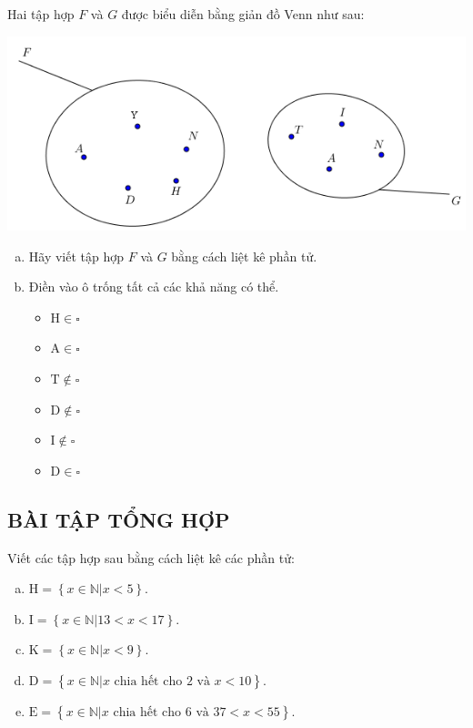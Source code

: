 \begin{bt}
Hai tập hợp $F$ và $G$ được biểu diễn bằng giản đồ Venn như sau:
\begin{center}
\includegraphics[scale=0.75]{img/bai4}
\end{center}
\begin{enumerate}[a)]
\item Hãy viết tập hợp $F$ và $G$ bằng cách liệt kê phần tử.
\item Điền vào ô trống tất cả các khả năng có thể. 
\begin{multicols}{2}
\begin{itemize}
\item $\text{H} \in \square$
\item $\text{A} \in \square$
\item $\text{T} \notin \square$
\item $\text{D} \notin \square$
\item $\text{I} \notin \square$
\item $\text{D} \in \square$
\end{itemize}
\end{multicols}
\end{enumerate}
\subsection{BÀI TẬP TỔNG HỢP}
\end{bt} 
\begin{bt}
Viết các tập hợp sau bằng cách liệt kê các phần tử:
\begin{enumerate}[a)]
\item $\mathrm{H}=\left\{ x\in \mathbb{N}| x < 5 \right\}$.
\item $\mathrm{I}=\left\{ x\in \mathbb{N}| 13 < x < 17 \right\}$.
\item $\mathrm{K}=\left\{ x\in \mathbb{N}| x < 9 \right\}$.
\item $\mathrm{D}=\left\{x\in \mathbb{N}| x \text{ chia hết cho }2 \text{ và } x < 10\right\}$.
\item $\mathrm{E}=\left\{x\in \mathbb{N}| x \text{ chia hết cho } 6 \text{ và } 37 < x < 55\right\}$.
\end{enumerate}
\end{bt} 
